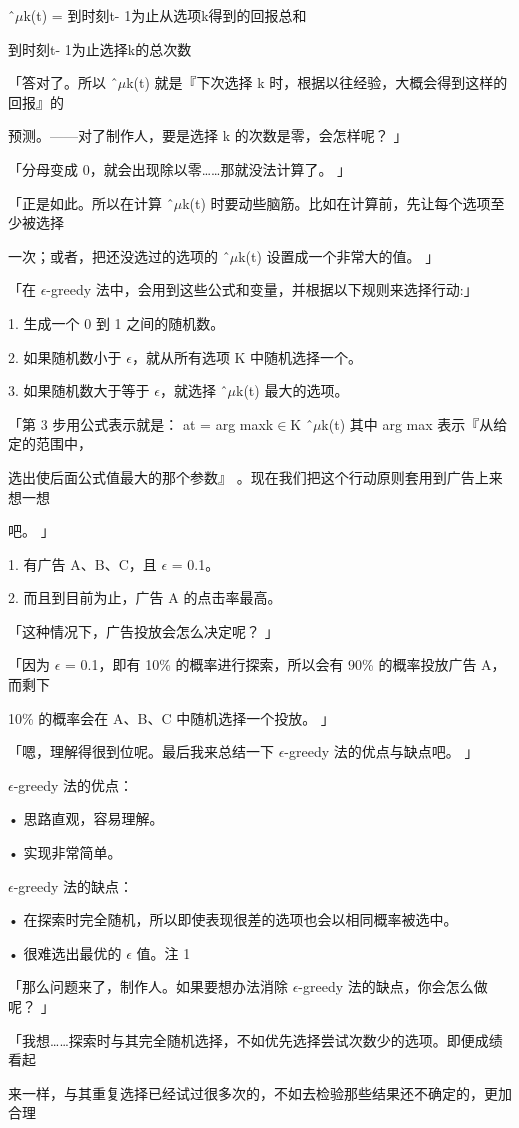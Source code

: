 ˆ$\mu$k(t) = 到时刻t- 1为止从选项k得到的回报总和\par
到时刻t- 1为止选择k的总次数\par
「答对了。所以 ˆ$\mu$k(t) 就是『下次选择 k 时，根据以往经验，大概会得到这样的回报』的\par
预测。——对了制作人，要是选择 k 的次数是零，会怎样呢？ 」\par
「分母变成 0，就会出现除以零……那就没法计算了。 」\par
「正是如此。所以在计算 ˆ$\mu$k(t) 时要动些脑筋。比如在计算前，先让每个选项至少被选择\par
一次；或者，把还没选过的选项的 ˆ$\mu$k(t) 设置成一个非常大的值。 」\par
「在 $\epsilon$-greedy 法中，会用到这些公式和变量，并根据以下规则来选择行动:」\par
1. 生成一个 0 到 1 之间的随机数。\par
2. 如果随机数小于 $\epsilon$，就从所有选项 K 中随机选择一个。\par
3. 如果随机数大于等于 $\epsilon$，就选择 ˆ$\mu$k(t) 最大的选项。\par
「第 3 步用公式表示就是： at = arg maxk$\in$K ˆ$\mu$k(t) 其中 arg max 表示『从给定的范围中，\par
选出使后面公式值最大的那个参数』 。现在我们把这个行动原则套用到广告上来想一想\par
吧。 」\par
1. 有广告 A、B、C，且 $\epsilon$ = 0.1。\par
2. 而且到目前为止，广告 A 的点击率最高。\par
「这种情况下，广告投放会怎么决定呢？ 」\par
「因为 $\epsilon$ = 0.1，即有 10\% 的概率进行探索，所以会有 90\% 的概率投放广告 A，而剩下\par
10\% 的概率会在 A、B、C 中随机选择一个投放。 」\par
「嗯，理解得很到位呢。最后我来总结一下 $\epsilon$-greedy 法的优点与缺点吧。 」\par
$\epsilon$-greedy 法的优点：\par
• 思路直观，容易理解。\par
• 实现非常简单。\par
$\epsilon$-greedy 法的缺点：\par
• 在探索时完全随机，所以即使表现很差的选项也会以相同概率被选中。\par
• 很难选出最优的 $\epsilon$ 值。注 1\par
「那么问题来了，制作人。如果要想办法消除 $\epsilon$-greedy 法的缺点，你会怎么做呢？ 」\par
「我想……探索时与其完全随机选择，不如优先选择尝试次数少的选项。即便成绩看起\par
来一样，与其重复选择已经试过很多次的，不如去检验那些结果还不确定的，更加合理\par

